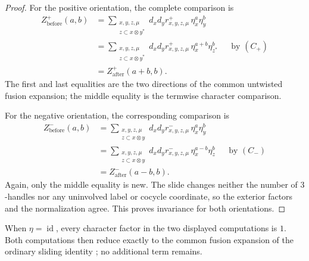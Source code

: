 \begin{proof}
For the positive orientation, the complete comparison is
\[
\begin{aligned}
 Z^+_{\mathrm{before}}(a,b)
 &=\sum_{\substack{x,y,z,\mu\\z\subset x\otimes y^*}}
   d_xd_y r^+_{x,y,z,\mu}\,
   \eta_x^a\eta_y^b \\
 &=\sum_{\substack{x,y,z,\mu\\z\subset x\otimes y^*}}
   d_xd_y r^+_{x,y,z,\mu}\,
   \eta_x^{a+b}\eta_{z^*}^{b}
   &&\text{by \((C_+)\)}\\
 &=Z^+_{\mathrm{after}}(a+b,b).
\end{aligned}
\]
The first and last equalities are the two directions of the common
untwisted fusion expansion; the middle equality is the termwise character
comparison.

For the negative orientation, the corresponding comparison is
\[
\begin{aligned}
 Z^-_{\mathrm{before}}(a,b)
 &=\sum_{\substack{x,y,z,\mu\\z\subset x\otimes y}}
   d_xd_y r^-_{x,y,z,\mu}\,
   \eta_x^a\eta_y^b \\
 &=\sum_{\substack{x,y,z,\mu\\z\subset x\otimes y}}
   d_xd_y r^-_{x,y,z,\mu}\,
   \eta_x^{a-b}\eta_z^{b}
   &&\text{by \((C_-)\)}\\
 &=Z^-_{\mathrm{after}}(a-b,b).
\end{aligned}
\]
Again, only the middle equality is new.  The slide changes neither the number
of \(3\)-handles nor any uninvolved label or cocycle coordinate, so the
exterior factors and the normalization agree.  This proves invariance for
both orientations.
\end{proof}

\begin{remark}
When \(\eta=\operatorname{id}\), every character factor in the two displayed
computations is \(1\).  Both computations then reduce exactly to the common
fusion expansion of the ordinary sliding identity
\cite[Lemma~2.30]{Tham2021}; no additional term remains.
\end{remark}
